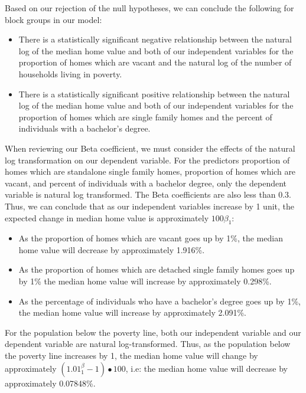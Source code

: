 \documentclass[
]{article}
\providecommand{\tightlist}{%
  \setlength{\itemsep}{0pt}\setlength{\parskip}{0pt}}
\begin{document}
Based on our rejection of the null hypotheses, we can conclude the
following for block groups in our model:

\begin{itemize}
\tightlist
\item
  There is a statistically significant negative relationship between the
  natural log of the median home value and both of our independent
  variables for the proportion of homes which are vacant and the natural
  log of the number of households living in poverty.
\item
  There is a statistically significant positive relationship between the
  natural log of the median home value and both of our independent
  variables for the proportion of homes which are single family homes
  and the percent of individuals with a bachelor's degree.
\end{itemize}

When reviewing our Beta coefficient, we must consider the effects of the
natural log transformation on our dependent variable. For the predictors
proportion of homes which are standalone single family homes, proportion
of homes which are vacant, and percent of individuals with a bachelor
degree, only the dependent variable is natural log transformed. The Beta
coefficients are also less than 0.3. Thus, we can conclude that as our
independent variables increase by 1 unit, the expected change in median
home value is approximately \(100𝛽_1%
\):

\begin{itemize}
\tightlist
\item
  As the proportion of homes which are vacant goes up by 1\%, the median
  home value will decrease by approximately 1.916\%.
\item
  As the proportion of homes which are detached single family homes goes
  up by 1\% the median home value will increase by approximately
  0.298\%.
\item
  As the percentage of individuals who have a bachelor's degree goes up
  by 1\%, the median home value will increase by approximately 2.091\%.
\end{itemize}

For the population below the poverty line, both our independent variable
and our dependent variable are natural log-transformed. Thus, as the
population below the poverty line increases by 1, the median home value
will change by approximately \((1.01^𝛽_1 −1)∙100%
\), i.e: the median home value will decrease by approximately 0.07848\%.
\end{document}
